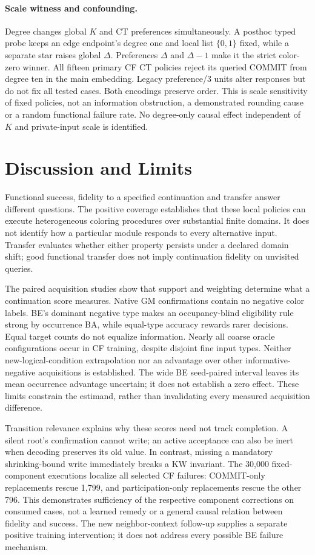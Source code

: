 \documentclass[10pt]{article}
\begin{document}
\paragraph{Scale witness and confounding.}
Degree changes global $K$ and CT preferences simultaneously. A posthoc typed
probe keeps an edge endpoint's degree one and local list $\{0,1\}$ fixed,
while a separate star raises global $\Delta$. Preferences $\Delta$ and
$\Delta-1$ make it the strict color-zero winner. All fifteen primary CF CT
policies reject its queried COMMIT from degree ten in the main embedding.
Legacy preference/3 units alter responses but do not fix all tested cases.
Both encodings preserve order. This is scale sensitivity of fixed policies,
not an information obstruction, a demonstrated rounding cause or a random
functional failure rate. No degree-only causal effect independent of $K$
and private-input scale is identified.



\section{Discussion and Limits}
Functional success, fidelity to a specified continuation and transfer answer
different questions. The positive coverage establishes that these local
policies can execute heterogeneous coloring procedures over substantial
finite domains. It does not identify how a particular module responds to
every alternative input. Transfer evaluates whether either property persists
under a declared domain shift; good functional transfer does not imply
continuation fidelity on unvisited queries.

The paired acquisition studies show that support and weighting determine
what a continuation score measures. Native GM confirmations contain no
negative color labels. BE's dominant negative type makes an occupancy-blind
eligibility rule strong by occurrence BA, while equal-type accuracy rewards
rarer decisions. Equal target counts do not equalize information. Nearly
all coarse oracle configurations occur in CF training, despite disjoint
fine input types. Neither new-logical-condition extrapolation nor an
advantage over other informative-negative acquisitions is established.
The wide BE seed-paired interval leaves its mean occurrence advantage
uncertain; it does not establish a zero effect. These limits constrain the
estimand, rather than invalidating every measured acquisition difference.

Transition relevance explains why these scores need not track completion.
A silent root's confirmation cannot write; an active acceptance can also
be inert when decoding preserves its old value. In contrast, missing a
mandatory shrinking-bound write immediately breaks a KW invariant.
The 30,000 fixed-component executions localize all selected CF failures:
COMMIT-only replacements rescue 1,799, and participation-only replacements
rescue the other 796. This demonstrates sufficiency of the respective
component corrections on consumed cases, not a learned remedy or a general
causal relation between fidelity and success. The new neighbor-context
follow-up supplies a separate positive training intervention; it does not
address every possible BE failure mechanism.
\end{document}
